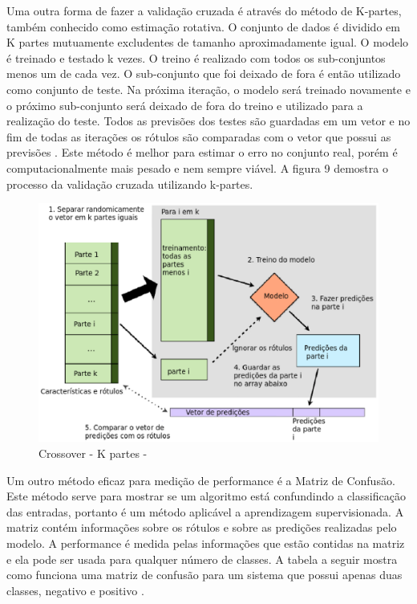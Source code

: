 Uma outra forma de fazer a validação cruzada é através do método de K-partes, também conhecido como estimação rotativa. O conjunto de dados é dividido em K partes mutuamente excludentes de tamanho aproximadamente igual. O modelo é treinado e testado k vezes. O treino é realizado com todos os sub-conjuntos menos um de cada vez. O sub-conjunto que foi deixado de fora é então utilizado como conjunto de teste. Na próxima iteração, o modelo será treinado novamente e o próximo sub-conjunto será deixado de fora do treino e utilizado para a realização do teste. Todos as previsões dos testes são guardadas em um vetor e no fim de todas as iterações os rótulos são comparadas com o vetor que possui as previsões \cite{astudy1995}. Este método  é melhor para estimar o erro no conjunto real, porém é computacionalmente mais pesado e nem sempre viável. A figura 9 demostra o processo da validação cruzada utilizando k-partes.

\begin{figure}[!h]
\centering
\includegraphics[keepaspectratio=true,scale=0.60]
{figuras/kfolds.eps}
\caption{Crossover - K partes - \cite{real2013}}
\label{over}
\end{figure}

Um outro método eficaz para medição de performance é a Matriz de Confusão. Este método serve para mostrar se um algoritmo está confundindo a classificação das entradas, portanto é um método aplicável a aprendizagem supervisionada. A matriz contém informações sobre os rótulos e sobre as predições realizadas pelo modelo. A performance é medida pelas informações que estão contidas na matriz e ela pode ser usada para qualquer número de classes. A tabela a seguir mostra como funciona uma matriz de confusão para um sistema que possui apenas duas classes, negativo e positivo \cite{howard2012}. 

